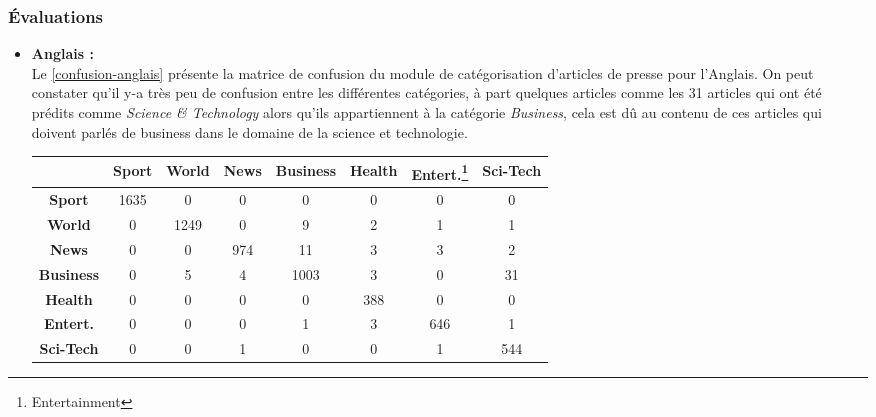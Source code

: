         \subsubsection{Évaluations}
        \begin{itemize}[leftmargin=*]
            \item{\textbf{Anglais :} }\\
                Le \autoref{confusion-anglais} présente la matrice de confusion du module de catégorisation d'articles de presse pour l'Anglais. On peut constater qu'il y-a très peu de confusion entre les différentes catégories, à part quelques articles comme les 31 articles qui ont été prédits comme \emph{Science \& Technology} alors qu'ils appartiennent à la catégorie \emph{Business}, cela est dû au contenu de ces articles qui doivent parlés de business dans le domaine de la science et technologie. 
                \begin{table}[H]
                    \begin{center}
                        \begin{tabular}{|c|c|c|c|c|c|c|c|}
                            \cline{2-8}
                            \multicolumn{1}{c|}{} & \textbf{Sport} &  \textbf{World} &  \textbf{News} &  \textbf{Business} &  \textbf{Health} & \textbf{Entert.\footnote{Entertainment}} &  \textbf{Sci-Tech} \\
                            \hline
                            \textbf{Sport} & 1635 & 0 & 0 & 0 & 0 & 0 & 0 \\
                            \hline
                            \textbf{World}  & 0 & 1249 & 0 & 9 & 2 & 1 & 1 \\
                            \hline
                            \textbf{News}  & 0 & 0 & 974 & 11 & 3 & 3 & 2 \\
                            \hline
                            \textbf{Business}  & 0 & 5 & 4 & 1003 & 3 & 0 & 31 \\
                            \hline
                            \textbf{Health}  & 0 & 0 & 0 & 0 & 388 & 0 & 0 \\
                            \hline
                            \textbf{Entert.}  & 0 & 0 & 0 & 1 & 3 & 646 & 1 \\
                            \hline
                            \textbf{Sci-Tech}  & 0 & 0 & 1 & 0 & 0 & 1 & 544 \\
                            \hline
                        \end{tabular}

\end{center}
\end{table}
\end{itemize}
